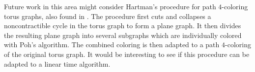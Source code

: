 \documentclass[letterpaper, 12pt]{article}
\theoremstyle{thm}
\begin{document}
Future work in this area might consider Hartman's procedure for path
$4$-coloring torus graphs, also found in \cite{hartman}. The procedure first
cuts and collapses a noncontractible cycle in the torus graph to form a plane
graph. It then divides the resulting plane graph
into several subgraphs which are individually colored with Poh's algorithm.
The combined coloring is then adapted to a path $4$-coloring of the original
torus graph. It would be interesting to see if this procedure can be adapted to
a linear time algorithm.

\begin{comment}

\begin{figure}
\begin{tikzpicture}[scale=0.7]
	\node (1) [label=left:{$1,2$}] at (-3.0cm, 1.0cm) {};
	\node (2) [label=above left:{$1,3$}] at (-1.5cm, 2.0cm) {};
	\node (3) [label=above:{$1,4$}] at (0.0cm, 2.0cm) {};
	\node (4) [label=above right:{$1,3$}] at (1.5cm, 2.0cm) {};
	\node (5) [label=right:{$1,2$}] at (3.0cm, 1.0cm) {};
	\node (6) [label=right:{$1,4$}] at (3.0cm, -1.0cm) {};
	\node (7) [label=below:{$3,4$}] at (1.5cm, -2.0cm) {};
	\node (8) [label=below:{$2 \ y$}] at (0.0cm, -2.0cm) {};
	\node (9) [label=below:{$1,3$}] at (-1.5cm, -2.0cm) {};
	\node (10) [label=left:{$1 \ x$}, ultra thick, fill=white] at (-3.0cm, -1.0cm) {};
	\node (11) [label=right:{$1,2,3$}] at (-1.6cm, 0.4cm) {};
	\node (12) [label=left:{$1,3,4$}] at (1.6cm, -0.8cm) {};
	
	\draw (1) edge (2); \draw (2) edge (3); \draw (3) edge (4);
	\draw (4) edge (5); \draw (5) edge (6); \draw (6) edge (7);
	\draw (7) edge (8); \draw (8) edge (9); \draw (9) edge (10) [ultra thick];
	\draw (10) edge (1);
	
	\draw (2) edge (11); \draw (3) edge (11); \draw (3) edge (6);
	\draw (4) edge (6); \draw (3) edge (8); \draw (7) edge (12);
	\draw (8) edge (11); \draw (9) edge (11); \draw (10) edge (11);
	\draw (10) edge (2); \draw (3) edge (12); \draw (6) edge (12);
	\draw (8) edge (12);
\end{tikzpicture}
\begin{tikzpicture}[scale=0.7]
	\node (1) [label=left:{$1,2$}] at (-3.0cm, 1.0cm) {};
	\node (2) [label=above left:{$1,3$}] at (-1.5cm, 2.0cm) {};
	\node (3) [label=above:{$1,4$}] at (0.0cm, 2.0cm) {};
	\node (4) [label=above right:{$1,3$}] at (1.5cm, 2.0cm) {};
	\node (5) [label=right:{$1,2$}] at (3.0cm, 1.0cm) {};
	\node (6) [label=right:{$1,4$}] at (3.0cm, -1.0cm) {};
	\node (7) [label=below:{$3,4$}] at (1.5cm, -2.0cm) {};
	\node (8) [label=below:{$2 \ y$}] at (0.0cm, -2.0cm) {};
	\node (9) [label=below:{$1,3$}] at (-1.5cm, -2.0cm) {};
	\node (10) [label=left:{$1 \ x$}, ultra thick, fill=white] at (-3.0cm, -1.0cm) {};
	\node (11) [label=right:{$1,2,3$}] at (-1.6cm, 0.4cm) {};
	\node (12) [label=left:{$1,3,4$}] at (1.6cm, -0.8cm) {};
	

\end{comment}
\end{document}
